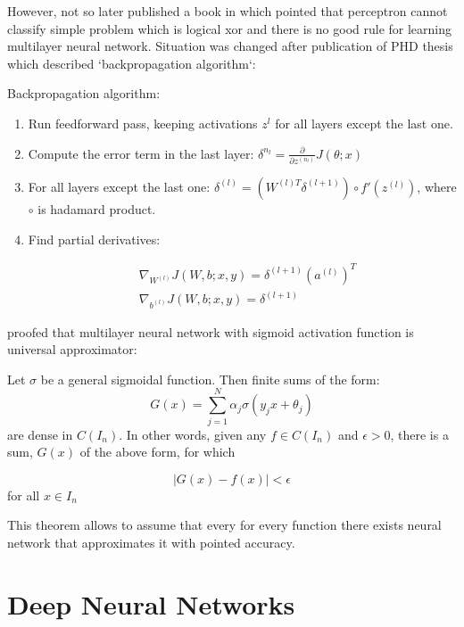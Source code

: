 However, not so later \textcite{minsky} published a book in which pointed that perceptron cannot classify simple problem which is logical xor and there is no good rule for learning multilayer neural network.
Situation was changed after publication of PHD thesis \parencite{werbos} which described `backpropagation algorithm`:

\begin{algorithm}
Backpropagation algorithm:
	\begin{enumerate}
		\item Run feedforward pass, keeping activations $z^{l}$ for all layers except the last one.
		\item Compute the error term in the last layer: $\delta^{n_l}=\frac{\partial}{\partial z^{(n_l)}} J(\theta;x)$ 
		\item For all layers except the last one: $\delta^{(l)}=(W^{(l)T}\delta^{(l+1)})\circ f'(z^{(l)})$, where $\circ$ is hadamard product.
		\item Find partial derivatives: 

\begin{align*}
& \nabla_{W^{(l)}}J(W,b;x,y)=\delta^{(l+1)}(a^{(l)})^T \\
& \nabla_{b^{(l)}}J(W,b;x,y)=\delta^{(l+1)} 
\end{align*}
	\end{enumerate}
\end{algorithm}


\textcite{cybenko_approximation_1989} proofed that multilayer neural network with sigmoid activation function is universal approximator:
\begin{theorem}

Let $\sigma$ be a general sigmoidal function. Then finite sums of the form:
\begin{equation}
	G(x)=\sum\limits^N_{j=1}\alpha_j\sigma(y_jx+\theta_j)
\end{equation}
are dense in $C(I_n)$. In other words, given any $f \in C(I_n)$ and $\epsilon > 0$, there is a sum, $G(x)$ of the above form, for which

\begin{equation}
	\left|G(x) - f(x)\right| < \epsilon
\end{equation}
for all $x \in I_n$

This theorem allows to assume that every for every function there exists neural network that approximates it with pointed accuracy.
\end{theorem}

\section{Deep Neural Networks}

